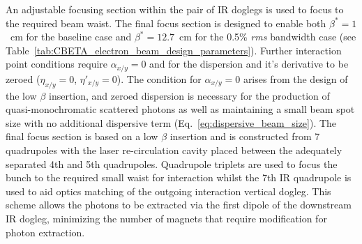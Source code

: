 \documentclass[../main.tex]{subfiles}
\begin{document}
An adjustable focusing section within the pair of IR doglegs is used to focus to the required beam waist. The final focus section is designed to enable both $\beta^{*} = 1$~\si{\centi\meter} for the baseline case and $\beta^{*} = 12.7$~\si{\centi\meter} for the 0.5\% \textit{rms} bandwidth case (see Table~\ref{tab:CBETA_electron_beam_design_parameters}). Further interaction point conditions require $\alpha_{x/y} =0$ and for the dispersion and it's derivative to be zeroed ($\eta_{x/y} = 0$, $\eta'_{x/y} = 0$). The condition for $\alpha_{x/y} = 0$ arises from the design of the low $\beta$ insertion, and zeroed dispersion is necessary for the production of quasi-monochromatic scattered photons as well as maintaining a small beam spot size with no additional dispersive term (Eq.~\ref{eq:dispersive_beam_size}). The final focus section is based on a low $\beta$ insertion \cite{chao2013handbook} and is constructed from 7 quadrupoles with the laser re-circulation cavity placed between the adequately separated 4th and 5th quadrupoles. Quadrupole triplets are used to focus the bunch to the required small waist for interaction whilst the 7th IR quadrupole is used to aid optics matching of the outgoing interaction vertical dogleg. This scheme allows the photons to be extracted via the first dipole of the downstream IR dogleg, minimizing the number of magnets that require modification for photon extraction. 
\end{document}
